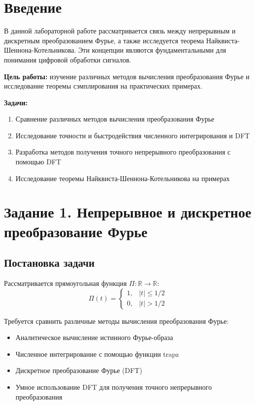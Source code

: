 \section*{Введение}

В данной лабораторной работе рассматривается связь между непрерывным и дискретным преобразованием Фурье, а также исследуется теорема Найквиста-Шеннона-Котельникова. Эти концепции являются фундаментальными для понимания цифровой обработки сигналов.

\textbf{Цель работы:} изучение различных методов вычисления преобразования Фурье и исследование теоремы сэмплирования на практических примерах.

\textbf{Задачи:}
\begin{enumerate}
    \item Сравнение различных методов вычисления преобразования Фурье
    \item Исследование точности и быстродействия численного интегрирования и DFT
    \item Разработка методов получения точного непрерывного преобразования с помощью DFT
    \item Исследование теоремы Найквиста-Шеннона-Котельникова на примерах
\end{enumerate}

\section*{Задание 1. Непрерывное и дискретное преобразование Фурье}

\subsection*{Постановка задачи}

Рассматривается прямоугольная функция $\Pi: \mathbb{R} \to \mathbb{R}$:
\begin{equation}
\Pi(t) = \begin{cases}
1, & |t| \leq 1/2 \\
0, & |t| > 1/2
\end{cases}
\end{equation}

Требуется сравнить различные методы вычисления преобразования Фурье:
\begin{itemize}
    \item Аналитическое вычисление истинного Фурье-образа
    \item Численное интегрирование с помощью функции trapz
    \item Дискретное преобразование Фурье (DFT)
    \item Умное использование DFT для получения точного непрерывного преобразования
\end{itemize}


